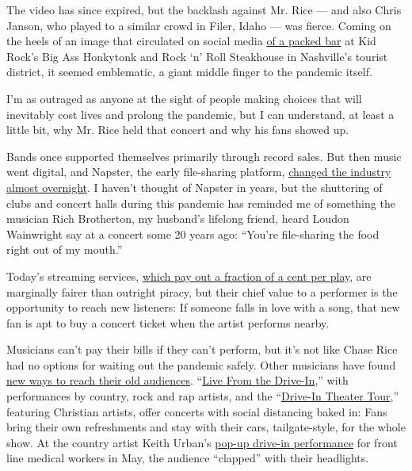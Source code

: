 The video has since expired, but the backlash against Mr. Rice --- and
also Chris Janson, who played to a similar crowd in Filer, Idaho --- was
fierce. Coming on the heels of an image that circulated on social media
\href{https://twitter.com/MissMandyHale/status/1272231947708891144}{of a
packed bar} at Kid Rock's Big Ass Honkytonk and Rock `n' Roll Steakhouse
in Nashville's tourist district, it seemed emblematic, a giant middle
finger to the pandemic itself.

I'm as outraged as anyone at the sight of people making choices that
will inevitably cost lives and prolong the pandemic, but I can
understand, at least a little bit, why Mr. Rice held that concert and
why his fans showed up.

Bands once supported themselves primarily through record sales. But then
music went digital, and Napster, the early file-sharing platform,
\href{https://www.nytimes3xbfgragh.onion/2000/07/15/opinion/freedom-one-song-at-a-time.html?searchResultPosition=2}{changed
the industry almost overnight}. I haven't thought of Napster in years,
but the shuttering of clubs and concert halls during this pandemic has
reminded me of something the musician Rich Brotherton, my husband's
lifelong friend, heard Loudon Wainwright say at a concert some 20 years
ago: ``You're file-sharing the food right out of my mouth.''

Today's streaming services,
\href{https://www.rollingstone.com/pro/features/how-musicians-make-money-or-dont-at-all-in-2018-706745/}{which
pay out a fraction of a cent per play}, are marginally fairer than
outright piracy, but their chief value to a performer is the opportunity
to reach new listeners: If someone falls in love with a song, that new
fan is apt to buy a concert ticket when the artist performs nearby.

Musicians can't pay their bills if they can't perform, but it's not like
Chase Rice had no options for waiting out the pandemic safely. Other
musicians have found
\href{https://www.vulture.com/2020/05/all-musicians-streaming-live-concerts.html}{new
ways to reach their old audiences}.
``\href{http://www.livenation.com/drivein/}{Live From the Drive-In},''
with performances by country, rock and rap artists, and the
``\href{https://www.driveintheatertour.com/}{Drive-In Theater Tour},''
featuring Christian artists, offer concerts with social distancing baked
in: Fans bring their own refreshments and stay with their cars,
tailgate-style, for the whole show. At the country artist Keith Urban's
\href{https://www.tennessean.com/story/entertainment/music/2020/05/15/keith-urban-drive-concert-stardust-vanderbilt-medical-workers-tennessee/5196898002/}{pop-up
drive-in performance} for front line medical workers in May, the
audience ``clapped'' with their headlights.

